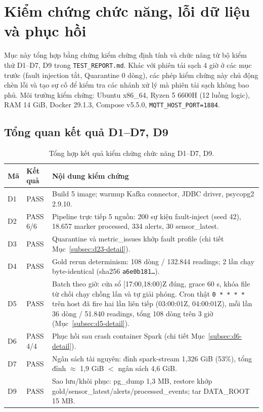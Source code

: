 \section{Kiểm chứng chức năng, lỗi dữ liệu và phục hồi}
\label{sec:functional-verification}

Mục này tổng hợp bằng chứng kiểm chứng định tính và chức năng từ bộ kiểm thử D1--D7, D9 trong \texttt{TEST\_REPORT.md}. Khác với phiên tải sạch 4 giờ ở các mục trước (fault injection tắt, Quarantine 0 dòng), các phép kiểm chứng này chủ động chèn lỗi và tạo sự cố để kiểm tra các nhánh xử lý mà phiên tải sạch không bao phủ. Môi trường kiểm chứng: Ubuntu x86\_64, Ryzen 5 6600H (12 luồng logic), RAM 14 GiB, Docker 29.1.3, Compose v5.5.0, \texttt{MQTT\_HOST\_PORT=1884}.

\subsection{Tổng quan kết quả D1--D7, D9}
\begin{table}[H]
\centering
\caption{Tổng hợp kết quả kiểm chứng chức năng D1--D7, D9.}
\label{tab:d-tests}
\small
\begin{tabularx}{\textwidth}{l l X}
\toprule
\textbf{Mã} & \textbf{Kết quả} & \textbf{Nội dung kiểm chứng} \\
\midrule
D1 & PASS & Build 5 image; warmup Kafka connector, JDBC driver, psycopg2 2.9.10. \\
D2 & PASS 6/6 & Pipeline trực tiếp 5 nguồn: 200 sự kiện fault-inject (seed 42), 18.657 marker processed, 334 alerts, 30 sensor\_latest. \\
D3 & PASS & Quarantine và metric\_issues khớp fault profile (chi tiết Mục~\ref{subsec:d23-detail}). \\
D4 & PASS & Gold rerun determinism: 108 dòng / 132.844 readings; 2 lần chạy byte-identical (sha256 \texttt{a6e0b181\ldots}). \\
D5 & PASS & Batch theo giờ: cửa sổ [17:00,18:00)Z đúng, grace 60 s, khóa file từ chối chạy chồng lấn và tự giải phóng. Cron thật \texttt{0 * * * *} trên host đã fire hai lần liên tiếp (03:00:01Z, 04:00:01Z), mỗi lần 36 dòng / 51.840 readings, tổng 108 dòng trên 3 giờ (Mục~\ref{subsec:d5-detail}). \\
D6 & PASS 4/4 & Phục hồi sau crash container Spark (chi tiết Mục~\ref{subsec:d6-detail}). \\
D7 & PASS & Ngân sách tài nguyên: đỉnh spark-stream 1{,}326 GiB (53\%), tổng đỉnh $\approx$ 1{,}9 GiB $<$ ngân sách 4{,}6 GiB. \\
D9 & PASS & Sao lưu/khôi phục: pg\_dump 1{,}3 MB, restore khớp gold/sensor\_latest/alerts/processed\_events; tar DATA\_ROOT 15 MB. \\
\bottomrule
\end{tabularx}
\end{table}

